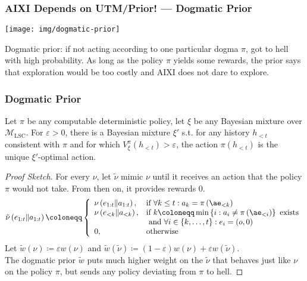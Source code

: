 \documentclass[UTF8,11pt,colorlinks,compress,openany]{beamer}%
\begin{document}
\begin{frame}\frametitle{AIXI Depends on UTM/Prior! --- Dogmatic Prior}
\setlength\abovedisplayskip{0pt}
\setlength\belowdisplayskip{0pt}
	\begin{center}
	\texttt{[image: img/dogmatic-prior]}
	\end{center}
	Dogmatic prior: if not acting according to one particular dogma $\pi$, got to hell with high probability. As long as the policy $\pi$ yields some rewards, the prior says that exploration would be too costly and AIXI does not dare to explore.
\end{frame}

\begin{frame}\frametitle{Dogmatic Prior}
\setlength\abovedisplayskip{0pt}
\setlength\belowdisplayskip{0pt}
	\begin{theorem}
		Let $\pi$ be any computable deterministic policy, let $\xi$ be any Bayesian mixture over $\mathcal{M}_{\mathrm{LSC}}$.	For $\varepsilon>0$, there is a Bayesian mixture $\xi'$ s.t. for any history $h_{<t}$ consistent with $\pi$ and for which $V_\xi^\pi(h_{<t})>\varepsilon$, the action $\pi(h_{<t})$ is the unique $\xi'$-optimal action.
	\end{theorem}
	\begin{proof}[Proof Sketch]
		For every $\nu$, let $\tilde{\nu}$ mimic $\nu$ until it receives an action that the policy $\pi$ would not take. From then on, it provides rewards $0$.
		\[
		\tilde{\nu}\left(e_{1:t} \| a_{1:t}\right)\coloneqq \left\{\begin{array}{ll}{\nu\left(e_{1:t} \| a_{1:t}\right),} & \mbox{if } \forall k \leq t: a_k=\pi\left(\ae_{<k}\right)\\
		{\nu\left(e_{<k} \| a_{<k}\right),} & \mbox{if } k\coloneqq \min\left\{i:a_i \ne \pi\left(\ae_{<i}\right)\right\} \mbox{ exists}\\
		{} & \mbox{ and } \forall i \in\{k,\dots,t\}: e_i=(o,0)\\
		{0,} & \mbox{otherwise}\end{array}\right.
		\]
	Let	$\tilde{w}(\nu)\coloneqq \varepsilon w(\nu)$ and $\tilde{w}(\tilde{\nu})\coloneqq (1-\varepsilon)w(\nu)+\varepsilon w(\tilde{\nu})$.\\
	The dogmatic prior $\tilde{w}$ puts much higher weight on the $\tilde{\nu}$ that behaves just like $\nu$ on the policy $\pi$, but sends any policy deviating from $\pi$ to hell.
	\end{proof}
\end{frame}
\end{document}
